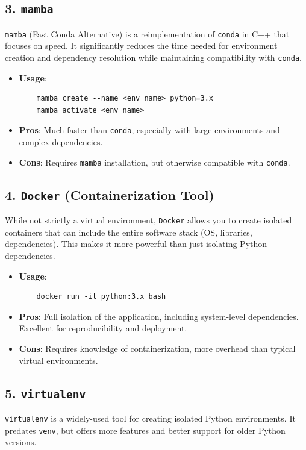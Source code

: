 \documentclass{article}
\begin{document}
\subsection{3. \texttt{mamba} }
\texttt{mamba} (Fast Conda Alternative) is a reimplementation of \texttt{conda} in C++ that focuses on speed. It significantly reduces the time needed for environment creation and dependency resolution while maintaining compatibility with \texttt{conda}.

\begin{itemize}
    \item \textbf{Usage}: 
    \begin{verbatim}
    mamba create --name <env_name> python=3.x
    mamba activate <env_name>
    \end{verbatim}
    \item \textbf{Pros}: Much faster than \texttt{conda}, especially with large environments and complex dependencies.
    \item \textbf{Cons}: Requires \texttt{mamba} installation, but otherwise compatible with \texttt{conda}.
\end{itemize}

\subsection{4. \texttt{Docker} (Containerization Tool)}
While not strictly a virtual environment, \texttt{Docker} allows you to create isolated containers that can include the entire software stack (OS, libraries, dependencies). This makes it more powerful than just isolating Python dependencies.

\begin{itemize}
    \item \textbf{Usage}: 
    \begin{verbatim}
    docker run -it python:3.x bash
    \end{verbatim}
    \item \textbf{Pros}: Full isolation of the application, including system-level dependencies. Excellent for reproducibility and deployment.
    \item \textbf{Cons}: Requires knowledge of containerization, more overhead than typical virtual environments.
\end{itemize}

\subsection{5. \texttt{virtualenv}}
\texttt{virtualenv} is a widely-used tool for creating isolated Python environments. It predates \texttt{venv}, but offers more features and better support for older Python versions.
\end{document}
